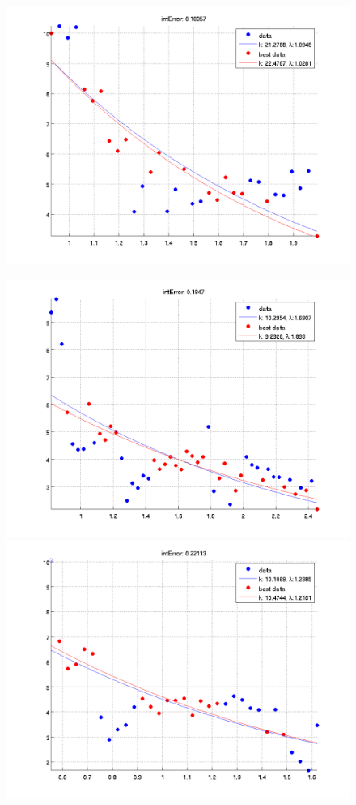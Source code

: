 \documentclass[12pt]{report}
\begin{document}
\begin{figure}[H]
\begin{minipage}[t]{0.5\linewidth}
	\includegraphics[scale=\imFeatBW]{images/best5}\\
\end{minipage}
\begin{minipage}[t]{0.5\linewidth}
	\centering
	\includegraphics[scale=\imFeatBW]{images/best2}\\
	\includegraphics[scale=\imFeatBW]{images/best4}\\

\end{minipage}
\end{figure}
\end{document}
